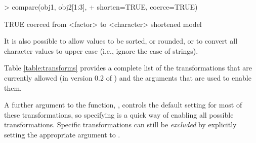 \begin{Schunk}
\begin{Sinput}
> compare(obj1, obj2[1:3], 
+         shorten=TRUE, coerce=TRUE)
\end{Sinput}
\begin{Soutput}
TRUE
  coerced from <factor> to <character>
  shortened model
\end{Soutput}
\end{Schunk}
It is also possible to allow values to
be sorted, or rounded, or to convert all character values to upper case
(i.e., ignore the case of strings).

Table \ref{table:transforms} provides a complete list of the
transformations that are currently allowed (in version 0.2
of ) and the arguments
that are used to enable them.  

A further argument to the  function, ,
controls the default setting for most of these transformations, so
specifying  is a quick way of enabling
all possible transformations.  Specific transformations 
can still be \emph{excluded} by explicitly setting the appropriate argument
to . 

